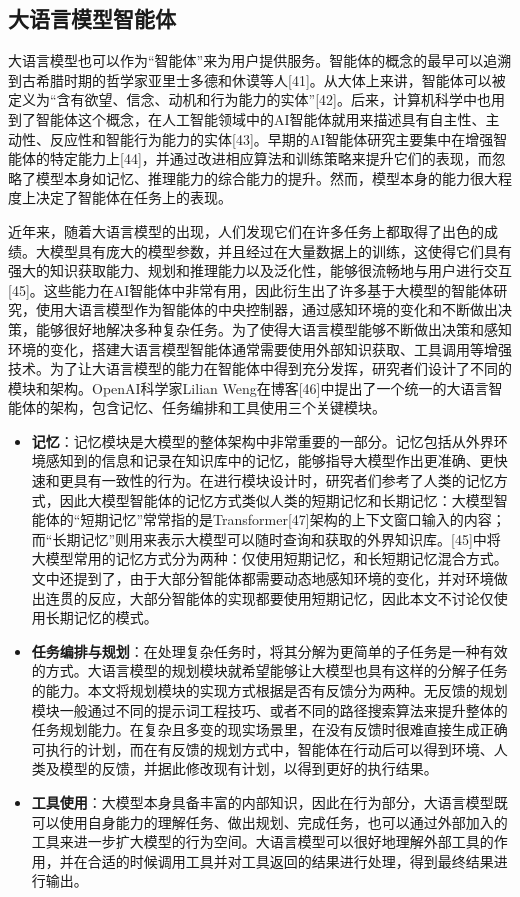 \subsection{大语言模型智能体}

大语言模型也可以作为“智能体”来为用户提供服务。智能体的概念的最早可以追溯到古希腊时期的哲学家亚里士多德和休谟等人[41]。从大体上来讲，智能体可以被定义为“含有欲望、信念、动机和行为能力的实体”[42]。后来，计算机科学中也用到了智能体这个概念，在人工智能领域中的AI智能体就用来描述具有自主性、主动性、反应性和智能行为能力的实体[43]。早期的AI智能体研究主要集中在增强智能体的特定能力上[44]，并通过改进相应算法和训练策略来提升它们的表现，而忽略了模型本身如记忆、推理能力的综合能力的提升。然而，模型本身的能力很大程度上决定了智能体在任务上的表现。

近年来，随着大语言模型的出现，人们发现它们在许多任务上都取得了出色的成绩。大模型具有庞大的模型参数，并且经过在大量数据上的训练，这使得它们具有强大的知识获取能力、规划和推理能力以及泛化性，能够很流畅地与用户进行交互[45]。这些能力在AI智能体中非常有用，因此衍生出了许多基于大模型的智能体研究，使用大语言模型作为智能体的中央控制器，通过感知环境的变化和不断做出决策，能够很好地解决多种复杂任务。为了使得大语言模型能够不断做出决策和感知环境的变化，搭建大语言模型智能体通常需要使用外部知识获取、工具调用等增强技术。为了让大语言模型的能力在智能体中得到充分发挥，研究者们设计了不同的模块和架构。OpenAI科学家Lilian Weng在博客[46]中提出了一个统一的大语言智能体的架构，包含记忆、任务编排和工具使用三个关键模块。

\begin{itemize}
    \item \textbf{记忆}：记忆模块是大模型的整体架构中非常重要的一部分。记忆包括从外界环境感知到的信息和记录在知识库中的记忆，能够指导大模型作出更准确、更快速和更具有一致性的行为。在进行模块设计时，研究者们参考了人类的记忆方式，因此大模型智能体的记忆方式类似人类的短期记忆和长期记忆：大模型智能体的“短期记忆”常常指的是Transformer[47]架构的上下文窗口输入的内容；而“长期记忆”则用来表示大模型可以随时查询和获取的外界知识库。[45]中将大模型常用的记忆方式分为两种：仅使用短期记忆，和长短期记忆混合方式。文中还提到了，由于大部分智能体都需要动态地感知环境的变化，并对环境做出连贯的反应，大部分智能体的实现都要使用短期记忆，因此本文不讨论仅使用长期记忆的模式。
    \item \textbf{任务编排与规划}：在处理复杂任务时，将其分解为更简单的子任务是一种有效的方式。大语言模型的规划模块就希望能够让大模型也具有这样的分解子任务的能力。本文将规划模块的实现方式根据是否有反馈分为两种。无反馈的规划模块一般通过不同的提示词工程技巧、或者不同的路径搜索算法来提升整体的任务规划能力。在复杂且多变的现实场景里，在没有反馈时很难直接生成正确可执行的计划，而在有反馈的规划方式中，智能体在行动后可以得到环境、人类及模型的反馈，并据此修改现有计划，以得到更好的执行结果。 
    \item \textbf{工具使用}：大模型本身具备丰富的内部知识，因此在行为部分，大语言模型既可以使用自身能力的理解任务、做出规划、完成任务，也可以通过外部加入的工具来进一步扩大模型的行为空间。大语言模型可以很好地理解外部工具的作用，并在合适的时候调用工具并对工具返回的结果进行处理，得到最终结果进行输出。
  \end{itemize}

